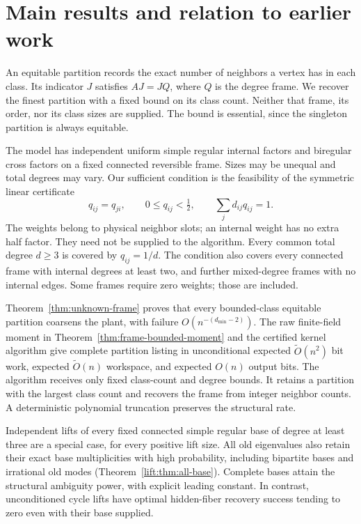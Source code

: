 \section{Main results and relation to earlier work}\label{sec:overview}
An equitable partition records the exact number of neighbors a vertex
has in each class. Its indicator $J$ satisfies $AJ=JQ$, where $Q$ is
the degree frame. We recover the finest partition with a fixed bound
on its class count. Neither that frame, its order, nor its class sizes
are supplied. The bound is essential, since the singleton partition
is always equitable.

The model has independent uniform simple regular internal factors and
biregular cross factors on a fixed connected reversible frame. Sizes
may be unequal and total degrees may vary. Our sufficient condition is
the feasibility of the symmetric linear certificate
\[
 q_{ij}=q_{ji},\qquad 0\le q_{ij}<\tfrac12,\qquad
 \sum_jd_{ij}q_{ij}=1.
\]
The weights belong to physical neighbor slots; an internal weight
has no extra half factor. They need not be supplied to the algorithm.
Every common total degree $d\ge3$ is covered by $q_{ij}=1/d$.
The condition also covers every connected frame with internal degrees
at least two, and further mixed-degree frames with no internal edges.
Some frames require zero weights; those are included.

Theorem~\ref{thm:unknown-frame} proves that every bounded-class
equitable partition coarsens the plant, with failure
$O(n^{-(d_{\min}-2)})$. The raw finite-field moment in
Theorem~\ref{thm:frame-bounded-moment} and the certified kernel algorithm
give complete partition listing in unconditional expected
$\widetilde O(n^2)$ bit work, expected $\widetilde O(n)$ workspace,
and expected $O(n)$ output bits. The algorithm receives only fixed
class-count and degree bounds. It retains a partition with the largest
class count and recovers the frame from integer neighbor counts.
A deterministic polynomial truncation preserves the structural rate.

Independent lifts of every fixed connected simple regular base of
degree at least three are a special case, for every positive lift
size. All old eigenvalues also retain their exact base multiplicities
with high probability, including bipartite bases and irrational
old modes (Theorem~\ref{lift:thm:all-base}).
Complete bases attain the structural ambiguity power, with explicit
leading constant. In contrast, unconditioned cycle lifts have optimal
hidden-fiber recovery success tending to zero even with their base
supplied.

